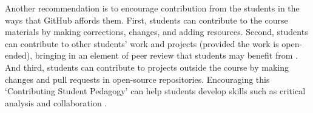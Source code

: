 

Another recommendation is to encourage contribution from the students in the ways that GitHub affords them. First, students can contribute to the course materials by making corrections, changes, and adding resources. Second, students can contribute to other students' work and projects (provided the work is open-ended), bringing in an element of peer review that students may benefit from \cite{sondergaard2012collaborative}. And third, students can contribute to projects outside the course by making changes and pull requests in open-source repositories. Encouraging this `Contributing Student Pedagogy' can help students develop skills such as critical analysis and collaboration \cite{falkner2012supporting}.


